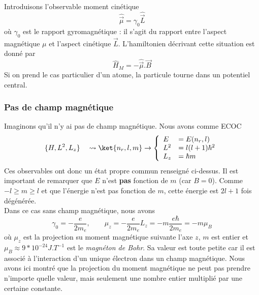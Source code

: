 	Introduisons l'observable moment cinétique
	\begin{equation}
	\hat{\vec{\mu}} = \gamma_0\hat{\vec{L}}
	\end{equation}
	où $\gamma_0$ est le rapport gyromagnétique : il s'agit du rapport entre 
	l'aspect magnétique $\mu$ et l'aspect cinétique $\vec{L}$. L'hamiltonien décrivant 
	cette situation est donné par 
	\begin{equation}
	\hat{H}_M = -\hat{\vec{\mu}}.\vec{B}
	\end{equation}
	Si on prend le cas particulier d'un atome, la particule tourne dans un potentiel central. 
	
		\subsubsection{Pas de champ magnétique}	
		Imaginons qu'il n'y ai 	pas de champ magnétique. Nous avons comme ECOC
		\begin{equation}
		\{H, L^2, L_z\}\quad \rightsquigarrow \ket{n_r,l,m} \rightarrow \left\{\begin{array}{ll}
		E &= E(n_r,l)\\
		L^2 &= l(l+1)\hbar^2\\
		L_z &= \hbar m
		\end{array}\right.
		\end{equation}
		Ces observables ont donc un état propre commun renseigné ci-dessus. Il est important de remarquer 
		que $E$ n'est \textbf{pas} fonction de $m$ (car $B=0$). Comme $-l\geq m\geq l$ et que 
		l'énergie n'est pas fonction de $m$, cette énergie est $2l+1$ fois dégénérée.\\
		
		Dans ce cas sans champ magnétique, nous avons
		\begin{equation}
		\gamma_0 = -\frac{e}{2m_e},\qquad \mu_z = -\frac{e}{2m_e}L_z = -m\frac{e\hbar}{2m_e} = 
		-m\mu_B
		\end{equation}
		où $\mu_z$ est la projection su moment magnétique suivante l'axe $z$, $m$ est entier 
		et $\mu_B \approx 9*10^{-24} J.T^{-1}$ est le \textit{magnéton de Bohr}. Sa valeur est 
		toute petite car il est associé à l'interaction d'un unique électron dans un champ
		magnétique. Nous avons ici montré que la projection du moment magnétique ne peut pas 
		prendre n'importe quelle valeur, mais seulement une nombre entier multiplié par une 
		certaine constante.
		
